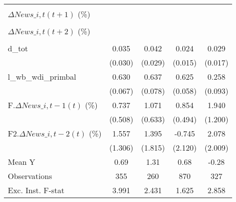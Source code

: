 {\begin{tabular}{l*{4}{c}}
                    &                     &                     &                     &                     \\
\addlinespace
$ \Delta News\_{i,t}(t+1)$ (\%)&                     &                     &                     &                     \\
                    &                     &                     &                     &                     \\
\addlinespace
$ \Delta News\_{i,t}(t+2)$ (\%)&                     &                     &                     &                     \\
                    &                     &                     &                     &                     \\
\addlinespace
d\_tot               &       0.035         &       0.042         &       0.024         &       0.029\sym{*}  \\
                    &     (0.030)         &     (0.029)         &     (0.015)         &     (0.017)         \\
\addlinespace
l\_wb\_wdi\_primbal    &       0.630\sym{***}&       0.637\sym{***}&       0.625\sym{***}&       0.258\sym{***}\\
                    &     (0.067)         &     (0.078)         &     (0.058)         &     (0.093)         \\
\addlinespace
F.$ \Delta News\_{i,t-1}(t)$ (\%)&       0.737         &       1.071\sym{*}  &       0.854\sym{*}  &       1.940         \\
                    &     (0.508)         &     (0.633)         &     (0.494)         &     (1.200)         \\
\addlinespace
F2.$ \Delta News\_{i,t-2}(t)$ (\%)&       1.557         &       1.395         &      -0.745         &       2.078         \\
                    &     (1.306)         &     (1.815)         &     (2.120)         &     (2.009)         \\
\midrule
Mean Y              &        0.69         &        1.31         &        0.68         &       -0.28         \\
Observations        &         355         &         260         &         870         &         327         \\
Exc. Inst. F-stat   &       3.991         &       2.431         &       1.625         &       2.858         \\
\bottomrule
\end{tabular}
}
